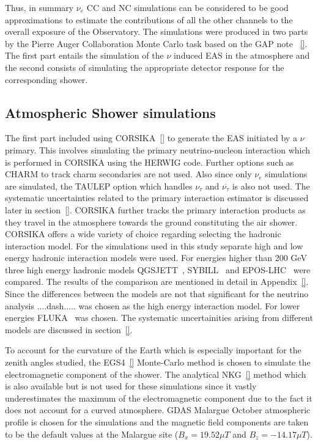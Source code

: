 Thus, in summary $\nu_e$ CC and NC simulations can be considered to be good approximations to estimate the contributions of all the other channels to the overall exposure of the Observatory. The simulations were produced in two parts by the Pierre Auger Collaboration Monte Carlo task based on the GAP note ~\ref{}. The first part entails the simulation of the $\nu$ induced EAS in the atmosphere and the second consists of simulating the appropriate detector response for the corresponding shower. 

\subsection{Atmospheric Shower simulations}
\label{subsec:sim_EAS}
The first part included using CORSIKA~\ref{} to generate the EAS initiated by a $\nu$ primary. This involves simulating the primary neutrino-nucleon interaction which is performed in CORSIKA using the HERWIG code. Further options such as CHARM to track charm secondaries are not used. Also since only $\nu_e$ simulations are simulated, the TAULEP option which handles $\nu_{\tau}$ and $\overline{\nu_{\tau}}$ is also not used. The systematic uncertainties related to the primary interaction estimator is discussed later in section~\ref{}. CORSIKA further tracks the primary interaction products as they travel in the atmosphere towards the ground constituting the air shower. CORSIKA offers a wide variety of choice regarding selecting the hadronic interaction model. For the simulations used in this study separate high and low energy hadronic interaction models were used. For energies higher than 200 GeV three high energy hadronic models QGSJETT~\cite{}, SYBILL~\cite{} and EPOS-LHC~\cite{} were compared. The results of the comparison are mentioned in detail in Appendix~\ref{}. Since the differences between the models are not that significant for the neutrino analysis ....dash..... was chosen as the high energy interaction model. For lower energies FLUKA~\cite{} was chosen. The systematic uncertainities arising from different models are discussed in section~\ref{}.  

To account for the curvature of the Earth which is especially important for the zenith angles studied, the EGS4~\ref{} Monte-Carlo method is chosen to simulate the electromagnetic component of the shower. The analytical NKG~\ref{} method which is also available but is not used for these simulations since it vastly underestimates the maximum of the electromagnetic component due to the fact it does not account for a curved atmosphere. GDAS Malargue October atmospheric profile is chosen for the simulations and the magnetic field components are taken to be the default values at the Malargue site ($B_x = 19.52\mu T$ and $B_z = -14.17\mu T$). 

